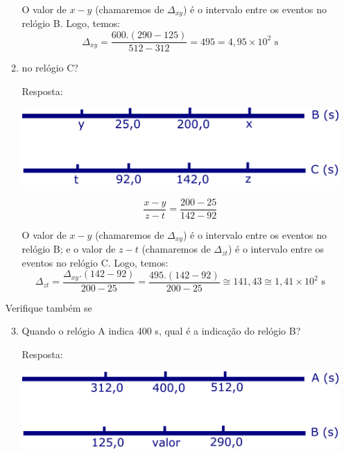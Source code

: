 \documentclass[12pt,a4paper,oneside]{article}
\begin{document}
\begin{enumerate}
\begin{enumerate}
{				O valor de $x-y$ (chamaremos de $\Delta_{xy}$) é o intervalo entre os eventos no relógio B. Logo, temos:							
				\begin{equation}
					\Delta_{xy} = \dfrac{600.(290-125)}{512-312} = 495 = 4,95 \times 10^2 \mbox{ s}
				\end{equation}
				
				
			}
			\item no relógio C?
			
			\vspace{0.3cm}
			
			{\color{blue} Resposta:
			
				\begin{center}
					\includegraphics[scale=0.4]{images/resp-b.png}
				\end{center}
				\vspace{0.2cm}
				
				\begin{equation}
					\dfrac{x-y}{z-t} = \dfrac{200-25}{142-92}
				\end{equation}
				
				O valor de $x-y$ (chamaremos de $\Delta_{xy}$) é o intervalo entre os eventos no relógio B; e o valor de $z-t$ (chamaremos de $\Delta_{zt}$) é o intervalo entre os eventos no relógio C. Logo, temos:							
				\begin{equation}
					\Delta_{zt} = \dfrac{\Delta_{xy}.(142-92)}{200-25} = \dfrac{495.(142-92)}{200-25} \cong 141,43 \cong 1,41 \times 10^2 \mbox{ s} \nonumber
				\end{equation}
			}
		\end{enumerate}
	Verifique também se
		\begin{enumerate}
			\setcounter{enumii}{2}
			\item Quando o relógio A indica 400 s, qual é a indicação do relógio B?
			
			\vspace{0.3cm}
			
			{\color{blue} Resposta:
			
				\begin{center}
					\includegraphics[scale=0.4]{images/resp-c.png}
				\end{center}
				\vspace{0.2cm}
				
}
\end{enumerate}
\end{enumerate}
\end{document}
